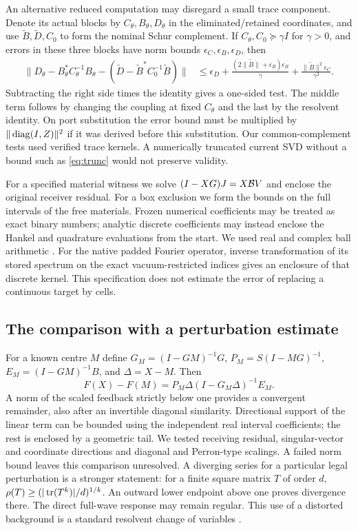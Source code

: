 An alternative reduced computation may disregard a small trace component. Denote its actual blocks by $C_\theta,B_\theta,D_\theta$ in the eliminated/retained coordinates, and use $\widetilde B,\widetilde D,C_0$ to form the nominal Schur complement. If $C_\theta,C_0\succeq\gamma I$ for $\gamma>0$, and errors in these three blocks have norm bounds $\epsilon_C,\epsilon_B,\epsilon_D$, then
\begin{align}
 \|D_\theta-B_\theta^*C_\theta^{-1}B_\theta-
 (\widetilde D-\widetilde B^*C_0^{-1}\widetilde B)\|
 &\le \epsilon_D+\frac{(2\|\widetilde B\|+\epsilon_B)\epsilon_B}{\gamma}
       +\frac{\|\widetilde B\|^2\epsilon_C}{\gamma^2}.
 \label{eq:trunc}
\end{align}
Subtracting the right side times the identity gives a one-sided test. The middle term follows by changing the coupling at fixed $C_\theta$ and the last by the resolvent identity. On port substitution the error bound must be multiplied by $\|\operatorname{diag}(I,Z)\|^2$ if it was derived before this substitution. Our common-complement tests used verified trace kernels. A numerically truncated current SVD without a bound such as \eqref{eq:trunc} would not preserve validity.

For a specified material witness we solve $(I-XG)J=X\mathcal B V$ and enclose the original receiver residual. For a box exclusion we form the bounds on the full intervals of the free materials. Frozen numerical coefficients may be treated as exact binary numbers; analytic discrete coefficients may instead enclose the Hankel and quadrature evaluations from the start. We used real and complex ball arithmetic \cite{arb}. For the native padded Fourier operator, inverse transformation of its stored spectrum on the exact vacuum-restricted indices gives an enclosure of that discrete kernel. This specification does not estimate the error of replacing a continuous target by cells.

\subsection{The comparison with a perturbation estimate}
For a known centre $M$ define $G_M=(I-GM)^{-1}G$, $P_M=S(I-MG)^{-1}$, $E_M=(I-GM)^{-1}B$, and $\Delta=X-M$. Then
\begin{equation}
 F(X)-F(M)=P_M\Delta(I-G_M\Delta)^{-1}E_M .
 \label{eq:neumann}
\end{equation}
A norm of the scaled feedback strictly below one provides a convergent remainder, also after an invertible diagonal similarity. Directional support of the linear term can be bounded using the independent real interval coefficients; the rest is enclosed by a geometric tail. We tested receiving residual, singular-vector and coordinate directions and diagonal and Perron-type scalings. A failed norm bound leaves this comparison unresolved. A diverging series for a particular legal perturbation is a stronger statement: for a finite square matrix $T$ of order $d$, $\rho(T)\ge(|\operatorname{tr}(T^k)|/d)^{1/k}$. An outward lower endpoint above one proves divergence there. The direct full-wave response may remain regular. This use of a distorted background is a standard resolvent change of variables \cite{dbim}.
